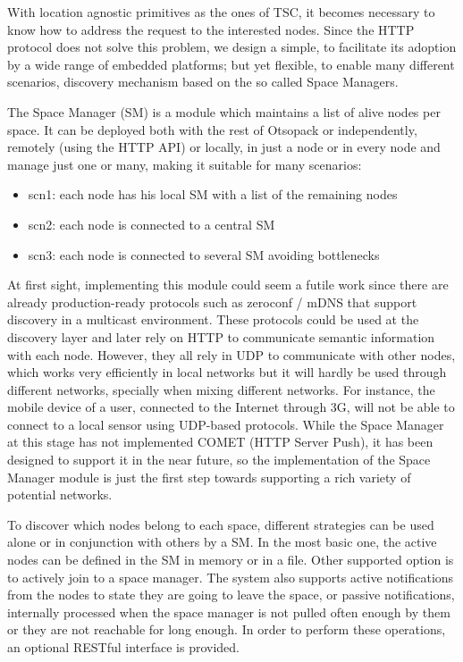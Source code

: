 With location agnostic primitives as the ones of TSC, it becomes necessary to know how to address the request to the
interested nodes. Since the HTTP protocol does not solve this problem, we design a  simple, to facilitate its
adoption by a wide range of embedded platforms; but yet flexible, to enable many different scenarios, discovery
mechanism based on the so called Space Managers. %

The Space Manager (SM) is a module which maintains a list of alive nodes per space. It can be deployed both with the
rest of Otsopack or independently, remotely (using the HTTP API) or locally, in just a node or in every node and manage
just one or many, making it suitable for many scenarios:
\begin{itemize}
 \item scn1: each node has his local SM with a list of the remaining nodes
 \item scn2: each node is connected to a central SM
 \item scn3: each node is connected to several SM avoiding bottlenecks
\end{itemize}

At first sight, implementing this module could seem a futile work since there are already production-ready protocols
such as zeroconf / mDNS that support discovery in a multicast environment. These protocols could be used at the
discovery layer and later rely on HTTP to communicate semantic information with each node. However, they all rely in
UDP to communicate with other nodes, which works very efficiently in local networks but it will hardly be used through
different networks, specially when mixing different networks. For instance, the mobile device of a user, connected to
the Internet through 3G, will not be able to connect to a local sensor using UDP-based protocols. While the Space
Manager at this stage has not implemented COMET (HTTP Server Push), it has been designed to support it in the near
future, so the implementation of the Space Manager module is just the first step towards supporting a rich variety of
potential networks.

To discover which nodes belong to each space, different strategies can be used alone or in conjunction with others by a
SM. In the most basic one, the active nodes can be defined in the SM in memory or in a file. Other supported option is
to actively join to a space manager. The system also supports active notifications from the nodes to state they are
going to leave the space, or passive notifications, internally processed when the space manager is not pulled often
enough by them or they are not reachable for long enough. In order to perform these operations, an optional RESTful
interface is provided.


